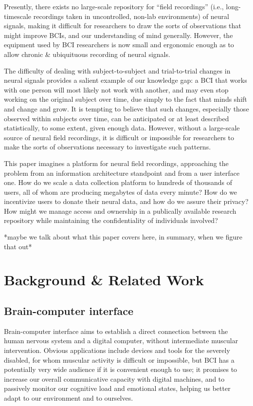 \documentclass[a4paper,twoside]{article}
\begin{document}
Presently, there exists no large-scale repository for ``field recordings'' (i.e., long-timescale recordings taken in uncontrolled, non-lab environments) of neural signals, making it difficult for researchers to draw the sorts of observations that might improve BCIs, and our understanding of mind generally. However, the equipment used by BCI researchers is now small and ergonomic enough as to allow chronic \& ubiquituous recording of neural signals.

The difficulty of dealing with subject-to-subject and trial-to-trial changes in neural signals provides a salient example of our knowledge gap: a BCI that works with one person will most likely not work with another, and may even stop working on the original subject over time, due simply to the fact that minds shift and change and grow. It is tempting to believe that such changes, especially those observed within subjects over time, can be anticipated or at least described statistically, to some extent, given enough data. However, without a large-scale source of neural field recordings, it is difficult or impossible for researchers to make the sorts of observations necessary to investigate such patterns.

This paper imagines a platform for neural field recordings, approaching the problem from an information architecture standpoint and from a user interface one. How do we scale a data collection platform to hundreds of thousands of users, all of whom are producing megabytes of data every minute? How do we incentivize users to donate their neural data, and how do we assure their privacy? How might we manage access and ownership in a publically available research repository while maintaining the confidentiality of individuals involved?

*maybe we talk about what this paper covers here, in summary, when we figure that out*






\section{Background \& Related Work}

\subsection{Brain-computer interface}

Brain-computer interface aims to establish a direct connection between the human nervous system and a digital computer, without intermediate muscular intervention. Obvious applications include devices and tools for the severely disabled, for whom muscular activity is difficult or impossible, but BCI has a potentially very wide audience if it is convenient enough to use; it promises to increase our overall communicative capacity with digital machines, and to passively monitor our cognitive load and emotional states, helping us better adapt to our environment and to ourselves.
\end{document}

